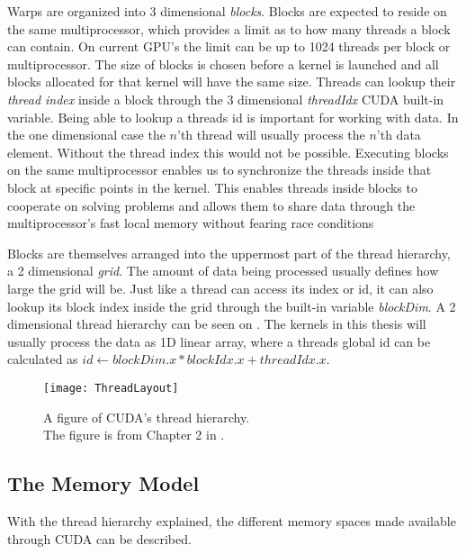 

Warps are organized into 3 dimensional \textit{blocks}. Blocks are
expected to reside on the same multiprocessor, which provides a limit
as to how many threads a block can contain. On current GPU's the limit
can be up to 1024 threads per block or multiprocessor. The size of
blocks is chosen before a kernel is launched and all blocks allocated
for that kernel will have the same size. Threads can lookup their
\textit{thread index} inside a block through the 3 dimensional
\textit{threadIdx} CUDA built-in variable. Being able to lookup a
threads id is important for working with data. In the one dimensional
case the $n$'th thread will usually process the $n$'th data
element. Without the thread index this would not be
possible. Executing blocks on the same multiprocessor enables us to
synchronize the threads inside that block at specific points in the
kernel. This enables threads inside blocks to cooperate on solving
problems and allows them to share data through the multiprocessor's
fast local memory without fearing race conditions


Blocks are themselves arranged into the uppermost part of the thread
hierarchy, a 2 dimensional \textit{grid}. The amount of data being
processed usually defines how large the grid will be. Just like a
thread can access its index or id, it can also lookup its block index
inside the grid through the built-in variable \textit{blockDim}. A 2
dimensional thread hierarchy can be seen on
. The kernels in this thesis will usually
process the data as 1D linear array, where a threads global id can be
calculated as $id \leftarrow blockDim.x * blockIdx.x + threadIdx.x$.

\begin{figure}
  \centering
  \texttt{[image: ThreadLayout]}
  \caption[CUDA's thread hierarchy.]{A figure of CUDA's thread
    hierarchy.\\ The figure is from Chapter 2 in .}
  \label{fig:threadLayout}
\end{figure}




\subsection{The Memory Model}\label{sec:memoryModel}

With the thread hierarchy explained, the different memory spaces made
available through CUDA can be described.  

